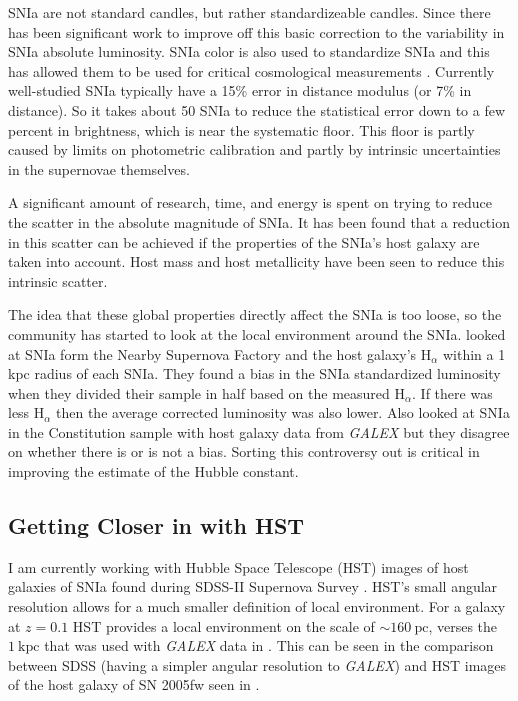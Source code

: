 \documentclass[apj, iop]{emulateapj}
\newcommand{\sn}{SNIa}
\newcommand{\todo}[1]{\textbf{\textcolor{red}{#1}}}
\newcommand{\Hubble}{\ensuremath{\text{H}_0}}
\begin{document}
\sn{} are not standard candles, but rather standardizeable candles. Since
\cite{Phillips93} there has been significant work to improve off this basic
correction to the variability in \sn{} absolute luminosity. \sn{} color is also
used to standardize \sn{} and this has allowed them to be used for critical
cosmological measurements \citep{Riess98, Perlmutter99}. Currently well-studied
\sn{} typically have a 15\% error in distance modulus (or 7\% in
distance). So it takes about 50 \sn{} to reduce the statistical error down to a
few percent in brightness, which is near the systematic floor. This floor
is partly caused by limits on photometric calibration and partly by intrinsic
uncertainties in the supernovae themselves.

A significant amount of research, time, and energy is spent on trying to reduce
the scatter in the absolute magnitude of \sn{}. It has been found that a
reduction in this scatter can be achieved if the properties of the \sn{}'s host
galaxy are taken into account. Host mass \citep{Childress13} and host
metallicity \citep{Hayden13} have been seen to reduce this intrinsic scatter.

The idea that these global properties directly affect the \sn{} is too loose, so
the community has started to look at the local environment around
the \sn{}. \cite{Rigault13} looked at \sn{} form the Nearby Supernova Factory
and the host galaxy's $\text{H}_{\alpha}$ within a 1 kpc radius of each \sn{}.
They found a bias in the \sn{} standardized luminosity when they divided their
sample in half based on the measured $\text{H}_{\alpha}$. If there was less
$\text{H}_{\alpha}$ then the average corrected luminosity was also lower.  Also
\cite{Rigault15, Jones15} looked at \sn{} in the Constitution sample with host
galaxy data from {\it GALEX} but they disagree on whether there is or is not a
bias.
Sorting this controversy out is critical in improving the estimate of the
Hubble constant.

\subsection{Getting Closer in with HST}\label{hst}

I am currently working with Hubble Space Telescope (HST) images of host galaxies
of \sn{} found during SDSS-II Supernova Survey
\citep{2008AJ....135..338F,2008AJ....135..348S}. HST's small angular resolution
allows for a much smaller definition of local environment. For a galaxy at $z =
0.1$ HST provides a local environment on the scale of $\sim 160~\text{pc}$,
verses the $1~\text{kpc}$ that was used with {\it GALEX} data in
\cite{Jones15,Rigault15}. This can be seen in the comparison between SDSS
(having a simpler angular resolution to {\it GALEX}) and HST images of the host
galaxy of SN 2005fw seen in .
\end{document}
